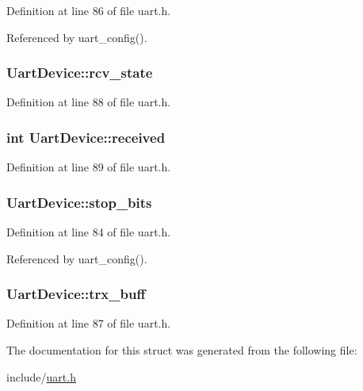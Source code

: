 Definition at line 86 of file uart.\-h.



Referenced by uart\-\_\-config().

\hypertarget{structUartDevice_a926d7397e6b1c1274d325de1f5d50772}{
\subsubsection[{rcv\-\_\-state}]{ Uart\-Device\-::rcv\-\_\-state}}\label{structUartDevice_a926d7397e6b1c1274d325de1f5d50772}


Definition at line 88 of file uart.\-h.

\hypertarget{structUartDevice_af8973705d358fe7d10ab6f3c1382a035}{
\subsubsection[{received}]{\setlength{\rightskip}{0pt plus 5cm}int Uart\-Device\-::received}}\label{structUartDevice_af8973705d358fe7d10ab6f3c1382a035}


Definition at line 89 of file uart.\-h.

\hypertarget{structUartDevice_a4c196eb55ccaa09061a843bbe47d29dc}{
\subsubsection[{stop\-\_\-bits}]{ Uart\-Device\-::stop\-\_\-bits}}\label{structUartDevice_a4c196eb55ccaa09061a843bbe47d29dc}


Definition at line 84 of file uart.\-h.



Referenced by uart\-\_\-config().

\hypertarget{structUartDevice_ab83762d1f1257fbbc3ba728520fa0231}{
\subsubsection[{trx\-\_\-buff}]{ Uart\-Device\-::trx\-\_\-buff}}\label{structUartDevice_ab83762d1f1257fbbc3ba728520fa0231}


Definition at line 87 of file uart.\-h.



The documentation for this struct was generated from the following file\-:\begin{DoxyCompactItemize}
\item 
include/\hyperlink{uart_8h}{uart.\-h}\end{DoxyCompactItemize}
